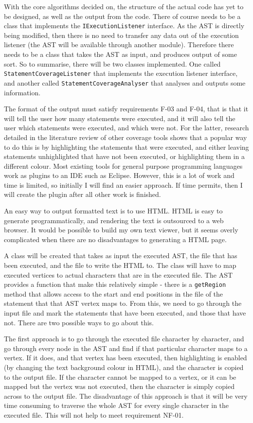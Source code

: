 With the core algorithms decided on, the structure of the actual code has yet to be designed, as well as the output from the code. There of course needs to be a class that implements the \verb|IExecutionListener| interface. As the AST is directly being modified, then there is no need to transfer any data out of the execution listener (the AST will be available through another module). Therefore there needs to be a class that takes the AST as input, and produces output of some sort. So to summarise, there will be two classes implemented. One called \verb|StatementCoverageListener| that implements the execution listener interface, and another called \verb|StatementCoverageAnalyser| that analyses and outputs some information.

The format of the output must satisfy requirements F-03 and F-04, that is that it will tell the user how many statements were executed, and it will also tell the user which statements were executed, and which were not. For the latter, research detailed in the literature review of other coverage tools shows that a popular way to do this is by highlighting the statements that were executed, and either leaving statements unhighlighted that have not been executed, or highlighting them in a different colour. Most existing tools for general purpose programming languages work as plugins to an IDE such as Eclipse. However, this is a lot of work and time is limited, so initially I will find an easier approach. If time permits, then I will create the plugin after all other work is finished.

An easy way to output formatted text is to use HTML. HTML is easy to generate programmatically, and rendering the text is outsourced to a web browser. It would be possible to build my own text viewer, but it seems overly complicated when there are no disadvantages to generating a HTML page.

A class will be created that takes as input the executed AST, the file that has been executed, and the file to write the HTML to. The class will have to map executed vertices to actual characters that are in the executed file. The AST provides a function that make this relatively simple - there is a \verb|getRegion| method that allows access to the start and end positions in the file of the statement that that AST vertex maps to. From this, we need to go through the input file and mark the statements that have been executed, and those that have not. There are two possible ways to go about this. 

The first approach is to go through the executed file character by character, and go through every node in the AST and find if that particular character maps to a vertex. If it does, and that vertex has been executed, then highlighting is enabled (by changing the text background colour in HTML), and the character is copied to the output file. If the character cannot be mapped to a vertex, or it can be mapped but the vertex was not executed, then the character is simply copied across to the output file. The disadvantage of this approach is that it will be very time consuming to traverse the whole AST for every single character in the executed file. This will not help to meet requirement NF-01.

